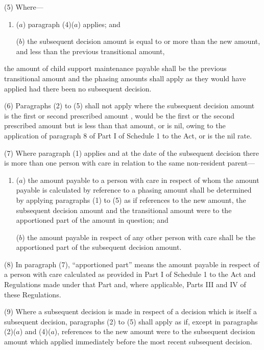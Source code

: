 \documentclass[12pt,a4paper]{article}
\begin{document}
(5) Where—
\begin{enumerate}\item[]
($a$) paragraph (4)($a$)  applies; and

($b$) the subsequent decision amount is equal to or more than the new amount,
and less than the previous transitional amount,  %
\end{enumerate}
the amount of child support maintenance payable shall be the previous transitional amount and the phasing amounts shall apply as they would have applied had there been no subsequent decision.

(6) Paragraphs (2) to (5) shall not apply where the subsequent decision amount is the first or second prescribed amount%
, would be the first or the second prescribed amount but is less than that amount, or is nil, owing to the application of paragraph 8 of Part I of Schedule 1 to the Act, or is the nil rate.  %

(7) Where paragraph (1) applies and at the date of the subsequent decision there is more than one person with care in relation to the same non-resident parent—
\begin{enumerate}\item[]
($a$) the amount payable to a person with care in respect of whom the amount payable is calculated by reference to a phasing amount shall be determined by applying paragraphs (1) to (5) as if references to the new amount, the subsequent decision amount and the transitional amount were to the apportioned part of the amount in question; and

($b$) the amount payable in respect of any other person with care shall be the apportioned part of the subsequent decision amount.
\end{enumerate}

(8) In paragraph (7), “apportioned part” means the amount payable in respect of a person with care calculated as provided in Part I of Schedule 1 to the Act and Regulations made under that Part and, where applicable, Parts III and IV of these Regulations.

(9) Where a subsequent decision is made in respect of a decision which is itself a subsequent decision, paragraphs (2) to (5) shall apply as if, except in paragraphs (2)($a$)  and (4)($a$), references to the new amount were to the subsequent decision amount which applied immediately before the most recent subsequent decision.
\end{document}
